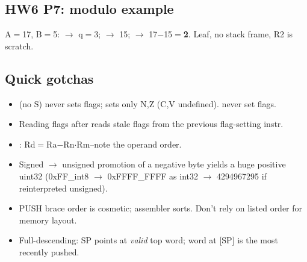 \subsection{HW6 P7: modulo example}
\begin{hwp}A$=$17, B$=$5:  $\to$ q$=$3;  $\to$ 15;  $\to$ 17$-$15$=$\textbf{2}. Leaf, no stack frame, R2 is scratch.\end{hwp}

\subsection{Quick gotchas}
\begin{itemize}
\item {} (no S) never sets flags;  sets only N,Z (C,V undefined).  never set flags.
\item Reading flags after  reads stale flags from the previous flag-setting instr.
\item {}: Rd$=$Ra$-$Rn$\cdot$Rm--note the operand order.
\item Signed $\to$ unsigned promotion of a negative byte yields a huge positive uint32 (0xFF\_int8 $\to$ 0xFFFF\_FFFF as int32 $\to$ 4294967295 if reinterpreted unsigned).
\item PUSH brace order is cosmetic; assembler sorts. Don't rely on listed order for memory layout.
\item Full-descending: SP points at \emph{valid} top word; word at [SP] is the most recently pushed.
\end{itemize}
